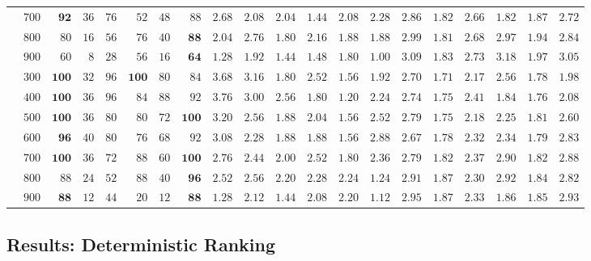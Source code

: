 \documentclass[letterpaper]{article}
\begin{document}
\begin{table}[t!]
\begin{tabular}{c|c|rrrrrr|rrrrrr|rrrrrr}
& $700$ & $\mathbf{92}$ & $36$ & $76$ & $52$ & $48$ & $88$ & $2.68$ & $2.08$ & $2.04$ & $\mathbf{1.44}$ & $2.08$ & $2.28$ & $2.86$ & $1.82$ & $2.66$ & $\mathbf{1.82}$ & $1.87$ & $2.72$ \\
& $800$ & $80$ & $16$ & $56$ & $76$ & $40$ & $\mathbf{88}$ & $2.04$ & $2.76$ & $\mathbf{1.80}$ & $2.16$ & $1.88$ & $1.88$ & $2.99$ & $\mathbf{1.81}$ & $2.68$ & $2.97$ & $1.94$ & $2.84$ \\
& $900$ & $60$ & $8$ & $28$ & $56$ & $16$ & $\mathbf{64}$ & $1.28$ & $1.92$ & $1.44$ & $1.48$ & $1.80$ & $\mathbf{1.00}$ & $3.09$ & $\mathbf{1.83}$ & $2.73$ & $3.18$ & $1.97$ & $3.05$ \\
\midrule
\parbox[t]{2mm}{}
& $300$ & $\mathbf{100}$ & $32$ & $96$ & $\mathbf{100}$ & $80$ & $84$ & $3.68$ & $3.16$ & $1.80$ & $2.52$ & $\mathbf{1.56}$ & $1.92$ & $2.70$ & $\mathbf{1.71}$ & $2.17$ & $2.56$ & $1.78$ & $1.98$ \\
& $400$ & $\mathbf{100}$ & $36$ & $96$ & $84$ & $88$ & $92$ & $3.76$ & $3.00$ & $2.56$ & $1.80$ & $\mathbf{1.20}$ & $2.24$ & $2.74$ & $\mathbf{1.75}$ & $2.41$ & $1.84$ & $1.76$ & $2.08$ \\
& $500$ & $\mathbf{100}$ & $36$ & $80$ & $80$ & $72$ & $\mathbf{100}$ & $3.20$ & $2.56$ & $1.88$ & $2.04$ & $\mathbf{1.56}$ & $2.52$ & $2.79$ & $\mathbf{1.75}$ & $2.18$ & $2.25$ & $1.81$ & $2.60$ \\
& $600$ & $\mathbf{96}$ & $40$ & $80$ & $76$ & $68$ & $92$ & $3.08$ & $2.28$ & $1.88$ & $1.88$ & $\mathbf{1.56}$ & $2.88$ & $2.67$ & $\mathbf{1.78}$ & $2.32$ & $2.34$ & $1.79$ & $2.83$ \\
& $700$ & $\mathbf{100}$ & $36$ & $72$ & $88$ & $60$ & $\mathbf{100}$ & $2.76$ & $2.44$ & $2.00$ & $2.52$ & $\mathbf{1.80}$ & $2.36$ & $2.79$ & $\mathbf{1.82}$ & $2.37$ & $2.90$ & $1.82$ & $2.88$ \\
& $800$ & $88$ & $24$ & $52$ & $88$ & $40$ & $\mathbf{96}$ & $2.52$ & $2.56$ & $2.20$ & $2.28$ & $2.24$ & $\mathbf{1.24}$ & $2.91$ & $1.87$ & $2.30$ & $2.92$ & $\mathbf{1.84}$ & $2.82$ \\
& $900$ & $\mathbf{88}$ & $12$ & $44$ & $20$ & $12$ & $\mathbf{88}$ & $1.28$ & $2.12$ & $1.44$ & $2.08$ & $2.20$ & $\mathbf{1.12}$ & $2.95$ & $1.87$ & $2.33$ & $1.86$ & $\mathbf{1.85}$ & $2.93$ \\
\end{tabular}
\end{table}

\subsection{Results: Deterministic Ranking}
\label{sec:detRankings}
\end{document}
